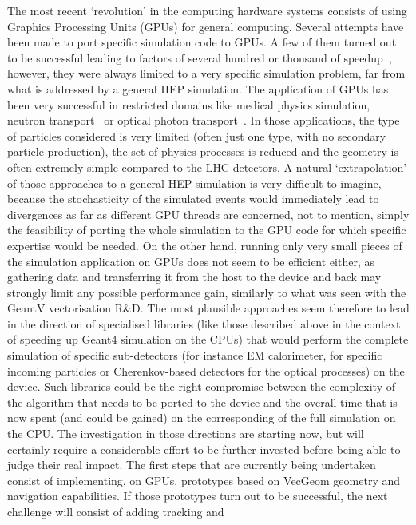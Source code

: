 \documentclass[11pt,a4paper]{article}
\begin{document}
The most recent `revolution' in the computing hardware systems consists
of using Graphics Processing Units (GPUs) for general computing. Several
attempts have been made to port specific simulation code to GPUs. A few
of them turned out to be successful leading to factors of several
hundred or thousand of speedup~\cite{GPU-MPEXS-DNA, Hybrid-Gate, Opticks}, however, they were always
limited to a very specific simulation problem, far from what is
addressed by a general HEP simulation. The application of GPUs has been
very successful in restricted domains like medical physics simulation,
neutron transport~\cite{SHIFT01} or optical photon transport~\cite{CHEP-Juno}. 
In those applications, the type of particles considered
is very limited (often just one type, with no secondary particle
production), the set of physics processes is reduced and the geometry is
often extremely simple compared to the LHC detectors. A natural
`extrapolation' of those approaches to a general HEP simulation is very
difficult to imagine, because the stochasticity of the simulated events
would immediately lead to divergences as far as different GPU threads
are concerned, not to mention, simply the feasibility of porting the
whole simulation to the GPU code for which specific expertise would be
needed. On the other hand, running only very small pieces of the
simulation application on GPUs does not seem to be efficient either, as
gathering data and transferring it from the host to the device and back
may strongly limit any possible performance gain, similarly to what was
seen with the GeantV vectorisation R\&D. The most plausible approaches
seem therefore to lead in the direction of specialised libraries (like
those described above in the context of speeding up Geant4 simulation on
the CPUs) that would perform the complete simulation of specific
sub-detectors (for instance EM calorimeter, for specific incoming
particles or Cherenkov-based detectors for the optical processes) on the
device. Such libraries could be the right compromise between the
complexity of the algorithm that needs to be ported to the device and
the overall time that is now spent (and could be gained) on the
corresponding of the full simulation on the CPU. The investigation in
those directions are starting now, but will certainly require a
considerable effort to be further invested before being able to judge
their real impact. The first steps that are currently being undertaken
consist of implementing, on GPUs, prototypes based on VecGeom geometry
and navigation capabilities. If those prototypes turn out to be
successful, the next challenge will consist of adding tracking and
\end{document}
